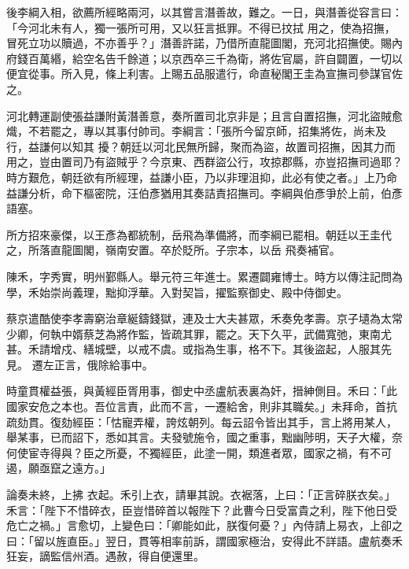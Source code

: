 \begin{pinyinscope}
 後李綱入相，欲薦所經略兩河，以其嘗言潛善故，難之。一日，與潛善從容言曰：「今河北未有人，獨一張所可用，又以狂言抵罪。不得已抆拭
 用之，使為招撫，冒死立功以贖過，不亦善乎？」潛善許諾，乃借所直龍圖閣，充河北招撫使。賜內府錢百萬緡，給空名告千餘道；以京西卒三千為衛，將佐官屬，許自闢置，一切以便宜從事。所入見，條上利害。上賜五品服遣行，命直秘閣王圭為宣撫司參謀官佐之。



 河北轉運副使張益謙附黃潛善意，奏所置司北京非是；且言自置招撫，河北盜賊愈熾，不若罷之，專以其事付帥司。李綱言：「張所今留京師，招集將佐，尚未及行，益謙何以知其
 擾？朝廷以河北民無所歸，聚而為盜，故置司招撫，因其力而用之，豈由置司乃有盜賊乎？今京東、西群盜公行，攻掠郡縣，亦豈招撫司過耶？時方艱危，朝廷欲有所經理，益謙小臣，乃以非理沮抑，此必有使之者。」上乃命益謙分析，命下樞密院，汪伯彥猶用其奏詰責招撫司。李綱與伯彥爭於上前，伯彥語塞。



 所方招來豪傑，以王彥為都統制，岳飛為準備將，而李綱已罷相。朝廷以王圭代之，所落直龍圖閣，嶺南安置。卒於貶所。子宗本，以岳
 飛奏補官。



 陳禾，字秀實，明州鄞縣人。舉元符三年進士。累遷闢雍博士。時方以傳注記問為學，禾始崇尚義理，黜抑浮華。入對契旨，擢監察御史、殿中侍御史。



 蔡京遣酷使李孝壽窮治章綖鑄錢獄，連及士大夫甚眾，禾奏免孝壽。京子壝為太常少卿，何執中婿蔡芝為將作監，皆疏其罪，罷之。天下久平，武備寬弛，東南尤甚。禾請增戍、繕城壁，以戒不虞。或指為生事，格不下。其後盜起，人服其先見。
 遷左正言，俄除給事中。



 時童貫權益張，與黃經臣胥用事，御史中丞盧航表裏為奸，搢紳側目。禾曰：「此國家安危之本也。吾位言責，此而不言，一遷給舍，則非其職矣。」未拜命，首抗疏劾貫。復劾經臣：「怙寵弄權，誇炫朝列。每云詔令皆出其手，言上將用某人，舉某事，已而詔下，悉如其言。夫發號施令，國之重事，黜幽陟明，天子大權，奈何使宦寺得與？臣之所憂，不獨經臣，此塗一開，類進者眾，國家之禍，有不可遏，願亟竄之遠方。」



 論奏未終，上拂
 衣起。禾引上衣，請畢其說。衣裾落，上曰：「正言碎朕衣矣。」禾言：「陛下不惜碎衣，臣豈惜碎首以報陛下？此曹今日受富貴之利，陛下他日受危亡之禍。」言愈切，上變色曰：「卿能如此，朕復何憂？」內侍請上易衣，上卻之曰：「留以旌直臣。」翌日，貫等相率前訴，謂國家極治，安得此不詳語。盧航奏禾狂妄，謫監信州酒。遇赦，得自便還里。




\end{pinyinscope}

